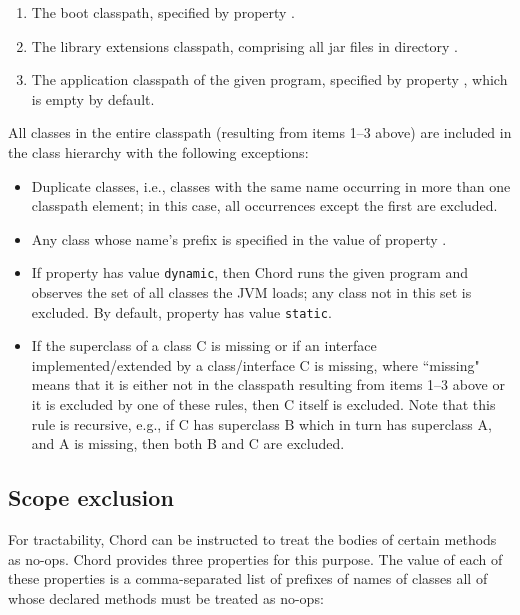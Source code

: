 \begin{enumerate}
\item
The boot classpath, specified by property .
\item
The library extensions classpath, comprising all jar files in
directory .
\item
The application classpath of the given program, specified by property ,
which is empty by default.
\end{enumerate}

All classes in the entire classpath (resulting from items 1--3 above)
are included in the class hierarchy with the following exceptions:
\begin{itemize}
\item
Duplicate classes, i.e., classes with the same name occurring in more
than one classpath element; in this case, all occurrences except the
first are excluded.
\item
Any class whose name's prefix is specified in the value of property
.
\item
If property  has value {\tt dynamic}, then
Chord runs the given program and observes the set of all classes the
JVM loads; any class not in this set is excluded.  By default,
property  has value {\tt static}.
\item
If the superclass of a class C is missing or if an interface
implemented/extended by a class/interface C is missing, where
``missing" means that it is either not in the classpath resulting from
items 1--3 above or it is excluded by one of these rules, then C
itself is excluded.  Note that this rule is recursive, e.g., if C has
superclass B which in turn has superclass A, and A is missing, then
both B and C are excluded.
\end{itemize}

\subsection{Scope exclusion}

For tractability, Chord can be instructed to treat the bodies of certain
methods as no-ops.  Chord provides three properties for this purpose.
The value of each of these properties is a comma-separated list of prefixes
of names of classes all of whose declared methods must be treated as no-ops:

